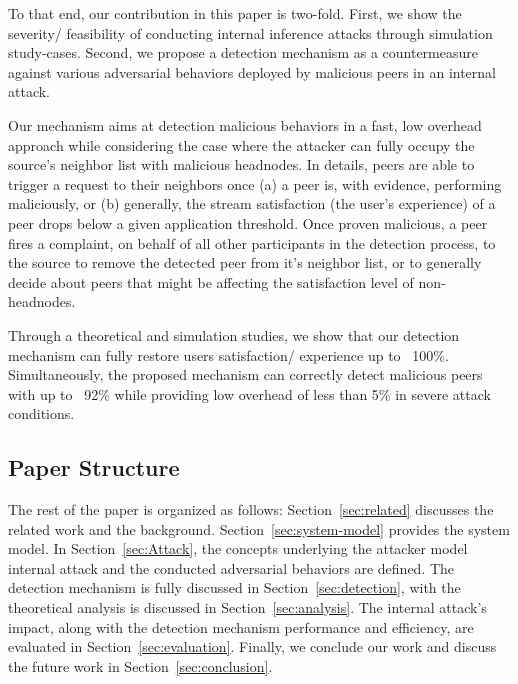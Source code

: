 To that end, our contribution in this paper is two-fold. 
First, we show the severity/ feasibility of conducting internal inference attacks through simulation study-cases.
Second, we propose a detection mechanism as a countermeasure against various adversarial behaviors deployed by malicious peers in an internal attack.

Our mechanism aims at detection malicious behaviors in a fast, low overhead approach while considering the case where the attacker can fully occupy the source's neighbor list with malicious headnodes.
In details, peers are able to trigger a request to their neighbors once (a) a peer is, with evidence, performing maliciously, or (b) generally, the stream satisfaction (the user's experience) of a peer drops below a given application threshold.
Once proven malicious, a peer fires a complaint, on behalf of all other participants in the detection process, to the source to remove the detected peer from it's neighbor list,
or to generally decide about peers that might be affecting the satisfaction level of non-headnodes.

Through a theoretical and simulation studies, we show that our detection mechanism can fully restore users satisfaction/ experience up to ~100\%.
Simultaneously, the proposed mechanism can correctly detect malicious peers with up to ~92\% while providing low overhead of less than 5\% in severe attack conditions.

\subsection*{Paper Structure}
The rest of the paper is organized as follows: Section~\ref{sec:related} discusses the related work and the background.
Section~\ref{sec:system-model} provides the system model. In Section~\ref{sec:Attack}, the concepts underlying the attacker model internal attack and the conducted adversarial behaviors are defined.
The detection mechanism is fully discussed in Section~\ref{sec:detection}, with the theoretical analysis is discussed in Section~\ref{sec:analysis}.
The internal attack's impact, along with the detection mechanism performance and efficiency, are evaluated in Section~\ref{sec:evaluation}. Finally, we conclude our work and discuss the future work in Section~\ref{sec:conclusion}.

 


